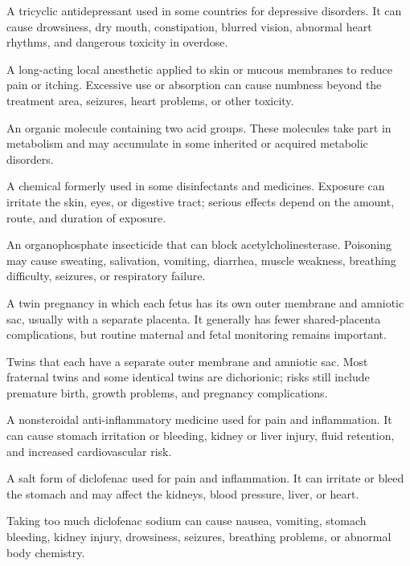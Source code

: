  A tricyclic antidepressant used in some countries for depressive disorders. It can cause drowsiness, dry mouth, constipation, blurred vision, abnormal heart rhythms, and dangerous toxicity in overdose.

 A long-acting local anesthetic applied to skin or mucous membranes to reduce pain or itching. Excessive use or absorption can cause numbness beyond the treatment area, seizures, heart problems, or other toxicity.

 An organic molecule containing two acid groups. These molecules take part in metabolism and may accumulate in some inherited or acquired metabolic disorders.

 A chemical formerly used in some disinfectants and medicines. Exposure can irritate the skin, eyes, or digestive tract; serious effects depend on the amount, route, and duration of exposure.

 An organophosphate insecticide that can block acetylcholinesterase. Poisoning may cause sweating, salivation, vomiting, diarrhea, muscle weakness, breathing difficulty, seizures, or respiratory failure.

 A twin pregnancy in which each fetus has its own outer membrane and amniotic sac, usually with a separate placenta. It generally has fewer shared-placenta complications, but routine maternal and fetal monitoring remains important.

 Twins that each have a separate outer membrane and amniotic sac. Most fraternal twins and some identical twins are dichorionic; risks still include premature birth, growth problems, and pregnancy complications.

 A nonsteroidal anti-inflammatory medicine used for pain and inflammation. It can cause stomach irritation or bleeding, kidney or liver injury, fluid retention, and increased cardiovascular risk.

 A salt form of diclofenac used for pain and inflammation. It can irritate or bleed the stomach and may affect the kidneys, blood pressure, liver, or heart.

 Taking too much diclofenac sodium can cause nausea, vomiting, stomach bleeding, kidney injury, drowsiness, seizures, breathing problems, or abnormal body chemistry.

